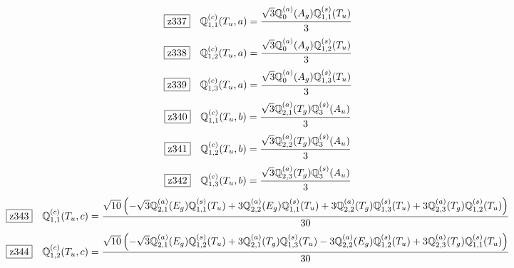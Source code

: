\documentclass[fleqn,10pt,landscape]{jsarticle}
\begin{document}
\begin{dmath*}
\hspace*{3mm}\fbox{z337}\quad \mathbb{Q}_{1,1}^{(c)}(T_{u},a)=\frac{\sqrt{3} \mathbb{Q}_{0}^{(a)}(A_{g}) \mathbb{Q}_{1,1}^{(s)}(T_{u})}{3}
\end{dmath*}
\begin{dmath*}
\hspace*{3mm}\fbox{z338}\quad \mathbb{Q}_{1,2}^{(c)}(T_{u},a)=\frac{\sqrt{3} \mathbb{Q}_{0}^{(a)}(A_{g}) \mathbb{Q}_{1,2}^{(s)}(T_{u})}{3}
\end{dmath*}
\begin{dmath*}
\hspace*{3mm}\fbox{z339}\quad \mathbb{Q}_{1,3}^{(c)}(T_{u},a)=\frac{\sqrt{3} \mathbb{Q}_{0}^{(a)}(A_{g}) \mathbb{Q}_{1,3}^{(s)}(T_{u})}{3}
\end{dmath*}
\begin{dmath*}
\hspace*{3mm}\fbox{z340}\quad \mathbb{Q}_{1,1}^{(c)}(T_{u},b)=\frac{\sqrt{3} \mathbb{Q}_{2,1}^{(a)}(T_{g}) \mathbb{Q}_{3}^{(s)}(A_{u})}{3}
\end{dmath*}
\begin{dmath*}
\hspace*{3mm}\fbox{z341}\quad \mathbb{Q}_{1,2}^{(c)}(T_{u},b)=\frac{\sqrt{3} \mathbb{Q}_{2,2}^{(a)}(T_{g}) \mathbb{Q}_{3}^{(s)}(A_{u})}{3}
\end{dmath*}
\begin{dmath*}
\hspace*{3mm}\fbox{z342}\quad \mathbb{Q}_{1,3}^{(c)}(T_{u},b)=\frac{\sqrt{3} \mathbb{Q}_{2,3}^{(a)}(T_{g}) \mathbb{Q}_{3}^{(s)}(A_{u})}{3}
\end{dmath*}
\begin{dmath*}
\hspace*{3mm}\fbox{z343}\quad \mathbb{Q}_{1,1}^{(c)}(T_{u},c)=\frac{\sqrt{10} \left(- \sqrt{3} \mathbb{Q}_{2,1}^{(a)}(E_{g}) \mathbb{Q}_{1,1}^{(s)}(T_{u}) + 3 \mathbb{Q}_{2,2}^{(a)}(E_{g}) \mathbb{Q}_{1,1}^{(s)}(T_{u}) + 3 \mathbb{Q}_{2,2}^{(a)}(T_{g}) \mathbb{Q}_{1,3}^{(s)}(T_{u}) + 3 \mathbb{Q}_{2,3}^{(a)}(T_{g}) \mathbb{Q}_{1,2}^{(s)}(T_{u})\right)}{30}
\end{dmath*}
\begin{dmath*}
\hspace*{3mm}\fbox{z344}\quad \mathbb{Q}_{1,2}^{(c)}(T_{u},c)=\frac{\sqrt{10} \left(- \sqrt{3} \mathbb{Q}_{2,1}^{(a)}(E_{g}) \mathbb{Q}_{1,2}^{(s)}(T_{u}) + 3 \mathbb{Q}_{2,1}^{(a)}(T_{g}) \mathbb{Q}_{1,3}^{(s)}(T_{u}) - 3 \mathbb{Q}_{2,2}^{(a)}(E_{g}) \mathbb{Q}_{1,2}^{(s)}(T_{u}) + 3 \mathbb{Q}_{2,3}^{(a)}(T_{g}) \mathbb{Q}_{1,1}^{(s)}(T_{u})\right)}{30}
\end{dmath*}
\end{document}
